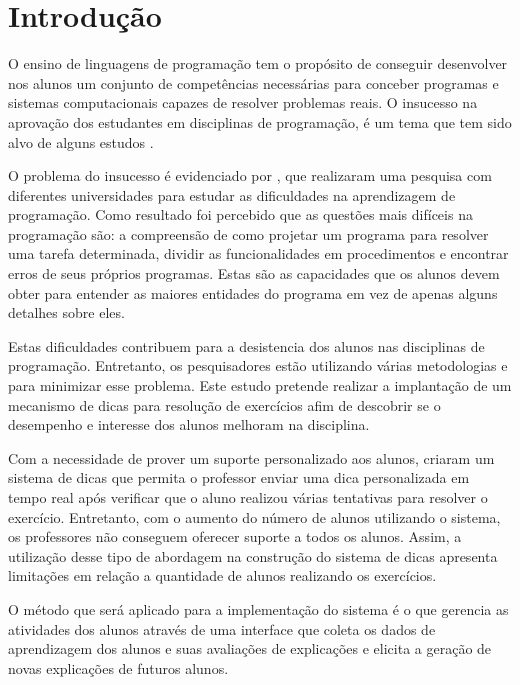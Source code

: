 \chapter{Introdução}

O ensino de linguagens de programação tem o propósito de conseguir desenvolver nos alunos um conjunto de competências necessárias para conceber programas e sistemas computacionais capazes de resolver problemas reais. O insucesso na aprovação dos estudantes em disciplinas de programação, é um tema que tem sido alvo de alguns estudos \cite{bosse2015reprovaccoes, Cukierman:2015:PSU:2729094.2742623}.

O problema do insucesso é evidenciado por , que realizaram uma pesquisa com diferentes universidades para estudar as dificuldades na aprendizagem de programação. Como resultado foi percebido que as questões mais difíceis na programação são: a compreensão de como projetar um programa para resolver uma tarefa determinada, dividir as funcionalidades em procedimentos e encontrar erros de seus próprios programas. Estas são as capacidades que os alunos devem obter para entender as maiores entidades do programa em vez de apenas alguns detalhes sobre eles.


Estas dificuldades contribuem para a desistencia dos alunos nas disciplinas de programação. Entretanto, os pesquisadores estão utilizando várias metodologias e  para minimizar esse problema. Este estudo pretende realizar a implantação de um mecanismo de dicas para resolução de exercícios afim de descobrir se o desempenho e interesse dos alunos melhoram na disciplina. 

Com a necessidade de prover um suporte personalizado aos alunos,  criaram um sistema de dicas que permita o professor enviar uma dica personalizada em tempo real após verificar que o aluno realizou várias tentativas para resolver o exercício. Entretanto, com o aumento do número de alunos utilizando o sistema, os professores não conseguem oferecer suporte a todos os alunos. Assim, a utilização desse tipo de abordagem na construção do sistema de dicas apresenta limitações em relação a quantidade de alunos realizando os exercícios.


O método que será aplicado para a implementação do sistema é o  que gerencia as atividades dos alunos através de uma interface que coleta os dados de aprendizagem dos alunos e suas avaliações de explicações e elicita a geração de novas explicações de futuros alunos.

